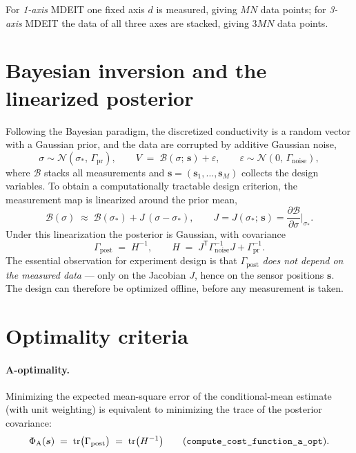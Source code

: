 \documentclass[11pt,a4paper]{article}
\newcommand{\tr}{\operatorname{tr}}
\newcommand{\T}{\mathsf{T}}
\newcommand{\Gnoise}{\Gamma_{\mathrm{noise}}}
\newcommand{\Gprior}{\Gamma_{\mathrm{pr}}}
\newcommand{\Gpost}{\Gamma_{\mathrm{post}}}
\newcommand{\sensor}[1]{\bm{s}_{#1}}
\newcommand{\code}[1]{\texttt{#1}}
\begin{document}
For \emph{1-axis} MDEIT one fixed axis $d$ is measured, giving $MN$ data points; for
\emph{3-axis} MDEIT the data of all three axes are stacked, giving $3MN$ data points.

\section{Bayesian inversion and the linearized posterior}

Following the Bayesian paradigm, the discretized conductivity is a random vector with a Gaussian
prior, and the data are corrupted by additive Gaussian noise,
\begin{equation}
  \sigma \sim \mathcal{N}(\sigma_*,\, \Gprior),
  \qquad
  V \;=\; \mathcal{B}(\sigma;\, \bm{s}) + \varepsilon,
  \qquad
  \varepsilon \sim \mathcal{N}(0,\, \Gnoise),
\end{equation}
where $\mathcal{B}$ stacks all measurements and $\bm{s} = (\sensor{1},\dots,\sensor{M})$ collects
the design variables. To obtain a computationally tractable design criterion, the measurement map
is linearized around the prior mean,
\begin{equation}
  \mathcal{B}(\sigma) \;\approx\; \mathcal{B}(\sigma_*) + J\,(\sigma - \sigma_*),
  \qquad
  J = J(\sigma_*;\, \bm{s}) = \frac{\partial \mathcal{B}}{\partial \sigma}\Big|_{\sigma_*} .
\end{equation}
Under this linearization the posterior is Gaussian, with covariance
\begin{equation}
\label{eq:posterior}
  \Gpost \;=\; H^{-1},
  \qquad
  H \;=\; J^\T \Gnoise^{-1} J + \Gprior^{-1} .
\end{equation}
The essential observation for experiment design is that $\Gpost$ \emph{does not depend on the
measured data} --- only on the Jacobian $J$, hence on the sensor positions $\bm{s}$. The design
can therefore be optimized offline, before any measurement is taken.

\section{Optimality criteria}

\paragraph{A-optimality.}
Minimizing the expected mean-square error of the conditional-mean estimate (with unit weighting)
is equivalent to minimizing the trace of the posterior covariance:
\begin{equation}
\label{eq:aopt}
  \Phi_{\mathrm{A}}(\bm{s}) \;=\; \tr\!\big(\Gpost\big) \;=\; \tr\!\big(H^{-1}\big)
  \qquad \text{(\code{compute\_cost\_function\_a\_opt})}.
\end{equation}
\end{document}
